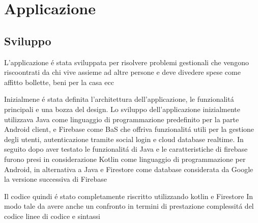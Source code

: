 \chapter{Applicazione}                %
\lhead[\fancyplain{}{\bfseries\thepage}]{\fancyplain{}{\bfseries\rightmark}}
\section{Sviluppo}                 %

L'applicazione \'e stata sviluppata per risolvere problemi gestionali che vengono riscoontrati da chi vive assieme ad altre persone e deve divedere spese come affitto bollette, beni per la casa ecc

Inizialmene \'e stata definita l'architettura dell'applicazione, le funzionalit\'a principali e una bozza del design.
Lo sviluppo dell'applicazione inizialmente utilizzava Java come linguaggio di programmazione predefinito per la parte Android client, e Firebase come BaS che offriva funzionalit\'a utili per la gestione degli utenti, autenticazione tramite social login e cloud database realtime.
In seguito dopo aver testato le funzionalit\'a di Java e le caratteristiche di firebase furono presi in considerazione Kotlin come linguaggio di programmazione per Android, in alternativa a Java e Firestore come database considerata da Google la versione successiva di Firebase

Il codice quindi \'e stato completamente riscritto utilizzando kotlin e Firestore In modo tale da avere anche un confronto in termini di prestazione complessit\'a del codice linee di codice e sintassi

